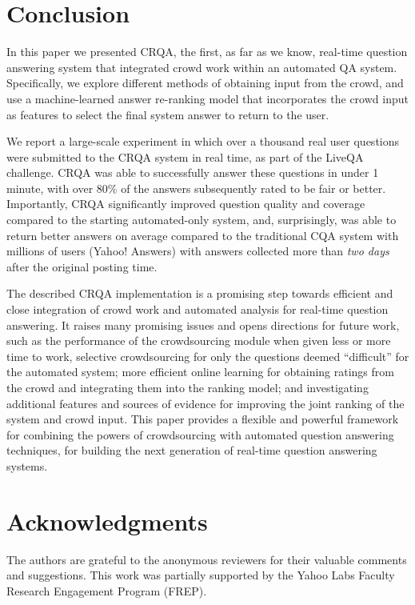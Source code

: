 \documentclass[letterpaper]{article}
\begin{document}
\section{Conclusion} 
In this paper we presented CRQA, the first, as far as we know, real-time question answering system that integrated crowd work within an automated QA system.
Specifically, we explore different methods of obtaining input from the crowd, and use a machine-learned answer re-ranking model that incorporates the crowd input as features to select the final system answer to return to the user. 

We report a large-scale experiment in which over a thousand real user questions were submitted to the CRQA system in real time, as part of the LiveQA challenge.
CRQA was able to successfully answer these questions in under 1 minute, with over 80\% of the answers subsequently rated to be fair or better.
Importantly, CRQA significantly improved question quality and coverage compared to the starting automated-only system, and, surprisingly, was able to return better answers on average compared to the traditional CQA system with millions of users (Yahoo! Answers) with answers collected more than \textit{two days} after the original posting time.

The described CRQA implementation is a promising step towards efficient and close integration of crowd work and automated analysis for real-time question answering.
It raises many promising issues and opens directions for future work, such as the performance of the crowdsourcing module when given less or more time to work, selective crowdsourcing for only the questions deemed ``difficult'' for the automated system; more efficient online learning for obtaining ratings from the crowd and integrating them into the ranking model; and investigating additional features and sources of evidence for improving the joint ranking of the system and crowd input.
This paper provides a flexible and powerful framework for combining the powers of crowdsourcing with automated question answering techniques, for building the next generation of real-time question answering systems.


\section{Acknowledgments}
The authors are grateful to the anonymous reviewers for their valuable comments and suggestions.
This work was partially supported by the Yahoo Labs Faculty Research Engagement Program (FREP).

\bigskip
\bigskip



\end{document}

